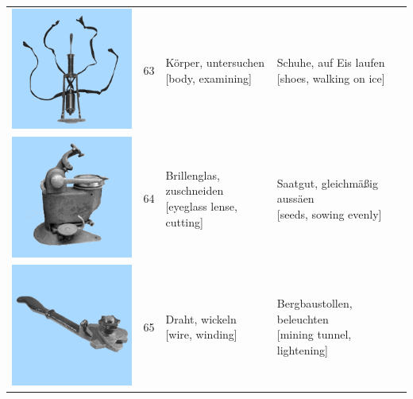 \documentclass[
  english,
  doc,12pt,twoside,floatsintext]{apa7}
\begin{document}
\begin{center}
\begin{ThreePartTable}
{\begin{longtable}{llll}
\includegraphics[valign=c, scale=0.23]{../materials/unfamiliar/63.png} & 63 & \makecell[l]{Körper, untersuchen\\{[body, examining]}} & \makecell[l]{Schuhe, auf Eis laufen\\{[shoes, walking on ice]}}\\
\includegraphics[valign=c, scale=0.23]{../materials/unfamiliar/64.png} & 64 & \makecell[l]{Brillenglas, zuschneiden\\{[eyeglass lense, cutting]}} & \makecell[l]{Saatgut, gleichmäßig aussäen\\{[seeds, sowing evenly]}}\\
\includegraphics[valign=c, scale=0.23]{../materials/unfamiliar/65.png} & 65 & \makecell[l]{Draht, wickeln\\{[wire, winding]}} & \makecell[l]{Bergbaustollen, beleuchten\\{[mining tunnel, lightening]}}\\

\end{longtable}}
\end{ThreePartTable}
\end{center}
\end{document}
